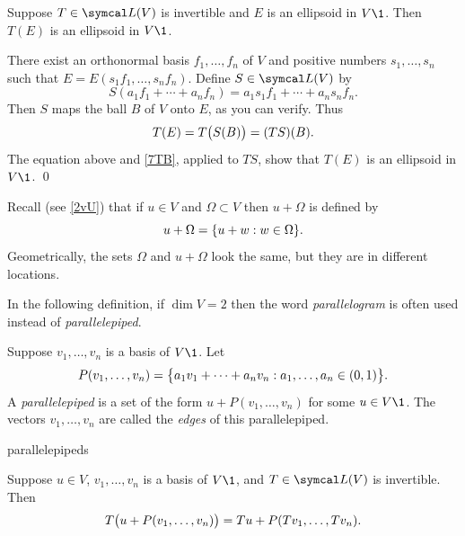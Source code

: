 {Suppose $T \in \L(V)$ is invertible and $E$ is an ellipsoid in $V\1$. Then $T(E)$ is an ellipsoid in $V\1$.}

\proof
There exist an orthonormal basis $f_1, \ldots, f_n$ of $V$ and positive numbers $s_1, \ldots, s_n$ such that
$E = E(s_1f_1, \ldots, s_nf_n)$. Define $S \in \L(V)$ by
\[
S( a_1 f_1 + \cdots + a_n f_n) = a_1 s_1 f_1 + \cdots + a_n s_n f_n.
\]
Then $S$ maps the ball $B$ of $V$ onto $E$, as you can verify. Thus
\[
T(E) = T\paren[\big]{ S(B) } = (TS)(B).
\]
The equation above and \ref{7TB}, applied to $TS$, show that $T(E)$ is an ellipsoid in $V\1$.
\qed

Recall (see \ref{2vU}) that if  $u \in V$ and $\Omega \subset V$ then $u + \Omega$ is defined by
\[
u + \Omega = \br{ u + w: w \in \Omega}.
\]
Geometrically, the sets $\Omega$ and $u + \Omega$ look the same, but they are in different locations.

In the following definition, if $\dim V = 2$ then the word \textit{parallelogram} is often used instead of \textit{parallelepiped}.

{Suppose $v_1, \ldots, v_n$ is a basis of $V\1$. Let
\[
P(v_1, \ldots, v_n) = \br[\big]{ a_1 v_1 + \cdots + a_n v_n: a_1, \ldots, a_n \in (0,1)}.
\]
A \emph{parallelepiped} is a set of the form $u + P(v_1, \ldots, v_n)$ for some $u \in V\1$. The vectors $v_1, \ldots, v_n$ are called the \textit{edges} of this parallelepiped.}

\begin{example}{parallelepipeds}
{
\overfullrule=0in

\noindent\hspace*{-.1in}\begin{minipage}{2.5in}
\end{minipage}
\hspace{-.2in}
\begin{minipage}{2.5in}
\end{minipage}

}

\bigskip
\end{example}

\pagebreak[3]

{Suppose $u \in V$, $v_1, \ldots, v_n$ is a basis of $V\1$, and $T \in \L(V)$ is invertible. Then
\[
T \paren[\big]{u +  P(v_1, \ldots, v_n) } = Tu + P(Tv_1, \ldots, Tv_n).
\]}

